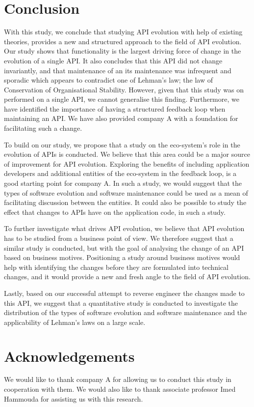 \documentclass{sig-alternate}
\begin{document}
\section{Conclusion} \label{conclusion}
With this study, we conclude that studying API evolution with help of existing theories, provides a new and structured approach to the field of API evolution. Our study shows that functionality is the largest driving force of change in the evolution of a single API. It also concludes that this API did not change invariantly, and that maintenance of an its maintenance was infrequent and sporadic which appears to contradict one of Lehman's law; the law of Conservation of Organisational Stability. However, given that this study was on performed on a single API, we cannot generalise this finding. Furthermore, we have identified the importance of having a structured feedback loop when maintaining an API. We have also provided company A with a foundation for facilitating such a change. 

To build on our study, we propose that a study on the eco-system's role in the evolution of APIs is conducted. We believe that this area could be a major source of improvement for API evolution. Exploring the benefits of including application developers and additional entities of the eco-system in the feedback loop, is a good starting point for company A. In such a study, we would suggest that the types of software evolution and software maintenance \cite{chapin2001types} could be used as a mean of facilitating discussion between the entities. It could also be possible to study the effect that changes to APIs have on the application code, in such a study. 

To further investigate what drives API evolution, we believe that API evolution has to be studied from a business point of view. We therefore suggest that a similar study is conducted, but with the goal of analysing the change of an API based on business motives. Positioning a study around business motives would help with identifying the changes before they are formulated into technical changes, and it would provide a new and fresh angle to the field of API evolution. 

Lastly, based on our successful attempt to reverse engineer the changes made to this API, we suggest that a quantitative study is conducted to investigate the distribution of the types of software evolution and software maintenance and the applicability of Lehman's laws on a large scale. 










\section*{Acknowledgements}
We would like to thank company A for allowing us to conduct this study in cooperation with them. We would also like to thank associate professor Imed Hammouda for assisting us with this research. 




 
\end{document}
